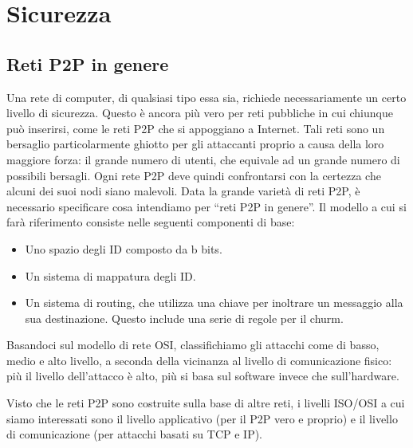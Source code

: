 \chapter{Sicurezza}\label{sicurezza}

\section{Reti P2P in genere}\label{reti-p2p-in-genere}

Una rete di computer, di qualsiasi tipo essa sia, richiede    necessariamente un certo livello di sicurezza. Questo è ancora più vero per reti pubbliche in cui chiunque può inserirsi, come le reti P2P che
si appoggiano a Internet.
Tali reti sono un bersaglio particolarmente ghiotto per gli attaccanti proprio a causa della loro maggiore forza: il grande numero di utenti,
che equivale ad un grande numero di possibili bersagli. Ogni rete P2P deve quindi confrontarsi con la certezza che alcuni dei suoi nodi siano
malevoli.  Data la grande varietà di reti P2P, è necessario specificare cosa intendiamo per ``reti P2P in genere''. Il modello \cite{vulnerabilities} a cui si farà riferimento consiste nelle seguenti componenti di base:

\begin{itemize}
\itemsep1pt\parskip0pt
\item
  Uno spazio degli ID composto da b bits.
\item
  Un sistema di mappatura degli ID.
\item
  Un sistema di routing, che utilizza una chiave per inoltrare un   messaggio alla sua destinazione. Questo include una serie di regole   per il churm.
\end{itemize}


Basandoci sul modello di rete OSI, classifichiamo gli attacchi come di basso, medio e alto livello, a seconda della vicinanza al livello di comunicazione fisico: più il livello dell'attacco è alto, più si basa sul software invece che sull'hardware.

Visto che le reti P2P sono costruite sulla base di altre reti, i livelli ISO/OSI a cui siamo interessati sono il livello applicativo (per il P2P vero e proprio) e il livello di comunicazione (per attacchi basati su TCP e IP).


